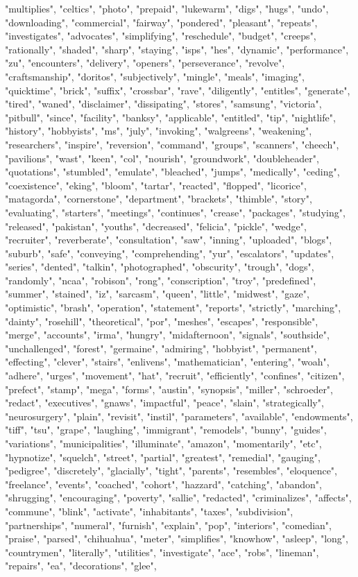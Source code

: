 "multiplies", "celtics", "photo", "prepaid", "lukewarm", "digs", "hugs", "undo", "downloading", "commercial", "fairway", "pondered", "pleasant", "repeats", "investigates", "advocates", "simplifying", "reschedule", "budget", "creeps", "rationally", "shaded", "sharp", "staying", "isps", "hes", "dynamic", "performance", "zu", "encounters", "delivery", "openers", "perseverance", "revolve", "craftsmanship", "doritos", "subjectively", "mingle", "meals", "imaging", "quicktime", "brick", "suffix", "crossbar", "rave", "diligently", "entitles", "generate", "tired", "waned", "disclaimer", "dissipating", "stores", "samsung", "victoria", "pitbull", "since", "facility", "banksy", "applicable", "entitled", "tip", "nightlife", "history", "hobbyists", "ms", "july", "invoking", "walgreens", "weakening", "researchers", "inspire", "reversion", "command", "groups", "scanners", "cheech", "pavilions", "wast", "keen", "col", "nourish", "groundwork", "doubleheader", "quotations", "stumbled", "emulate", "bleached", "jumps", "medically", "ceding", "coexistence", "eking", "bloom", "tartar", "reacted", "flopped", "licorice", "matagorda", "cornerstone", "department", "brackets", "thimble", "story", "evaluating", "starters", "meetings", "continues", "crease", "packages", "studying", "released", "pakistan", "youths", "decreased", "felicia", "pickle", "wedge", "recruiter", "reverberate", "consultation", "saw", "inning", "uploaded", "blogs", "suburb", "safe", "conveying", "comprehending", "yur", "escalators", "updates", "series", "dented", "talkin", "photographed", "obscurity", "trough", "dogs", "randomly", "ncaa", "robison", "rong", "conscription", "troy", "predefined", "summer", "stained", "iz", "sarcasm", "queen", "little", "midwest", "gaze", "optimistic", "brash", "operation", "statement", "reports", "strictly", "marching", "dainty", "rosehill", "theoretical", "por", "meshes", "escapes", "responsible", "merge", "accounts", "irma", "hungry", "midafternoon", "signals", "southside", "unchallenged", "forest", "germaine", "admiring", "hobbyist", "permanent", "effecting", "clever", "stairs", "enlivens", "mathematician", "entering", "woah", "adhere", "urges", "movement", "hat", "recruit", "efficiently", "confines", "citizen", "prefect", "stamp", "mega", "forms", "austin", "synopsis", "miller", "schroeder", "redact", "executives", "gnaws", "impactful", "peace", "slain", "strategically", "neurosurgery", "plain", "revisit", "instil", "parameters", "available", "endowments", "tiff", "tsu", "grape", "laughing", "immigrant", "remodels", "bunny", "guides", "variations", "municipalities", "illuminate", "amazon", "momentarily", "etc", "hypnotize", "squelch", "street", "partial", "greatest", "remedial", "gauging", "pedigree", "discretely", "glacially", "tight", "parents", "resembles", "eloquence", "freelance", "events", "coached", "cohort", "hazzard", "catching", "abandon", "shrugging", "encouraging", "poverty", "sallie", "redacted", "criminalizes", "affects", "commune", "blink", "activate", "inhabitants", "taxes", "subdivision", "partnerships", "numeral", "furnish", "explain", "pop", "interiors", "comedian", "praise", "parsed", "chihuahua", "meter", "simplifies", "knowhow", "asleep", "long", "countrymen", "literally", "utilities", "investigate", "ace", "robs", "lineman", "repairs", "ea", "decorations", "glee", 
